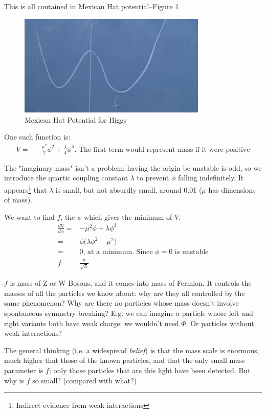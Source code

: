 \documentclass[]{article}
\begin{document}
This is all contained in Mexican Hat potential--Figure \ref{fig:2-10-MexicanHat}
\begin{figure}[H]
	\caption{Mexican Hat Potential for Higgs}\label{fig:2-10-MexicanHat}
	\includegraphics[width=0.8\textwidth]{2-10-MexicanHat}
\end{figure}
One such function is:
\begin{align*}
	V =& -\frac{\mu^2}{2} \phi^2 + \frac{\lambda}{4} \phi^4 \text{. The first term would represent mass if it were positive}
\end{align*}

The "imaginary mass" isn't a problem; having the origin be unstable is odd, so we introduce the quartic coupling constant $\lambda$ to prevent $\phi$ falling indefinitely. It appears\footnote{Indirect evidence from weak interactions} that $\lambda$ is small, but not absurdly small, around 0.01 ($\mu$ has dimensions of mass).

We want to find $f$, the $\phi$ which gives the minimum of $V$.
\begin{align*}
	\frac{d V}{d \phi} =& -\mu^2 \phi + \lambda \phi^3\\
	=& \phi \big(\lambda \phi^2 - \mu^2\big)\\
	=& 0 \text{, at a minimum. Since $\phi=0$ is unstable}\\
	f =& \frac{\mu}{\sqrt{\lambda}}
\end{align*}

$f$ is mass of Z or W Bosons, and it comes into mass of Fermion. It controls the masses of all the particles we know about: why are they all controlled by the same phenomenon? Why are there no particles whose mass doesn't involve spontaneous symmetry breaking? E.g. we can imagine a particle whose left and right variants both have weak charge: we wouldn't need $\Phi$. Or particles without weak interactions?

The general thinking (i.e. a widespread \emph{belief}) is that the mass scale is enormous, much higher that those of the known particles, and that the only small mass parameter is $f$; only those particles that are this light have been detected. But why is $f$ so small? (compared with what?) 
\end{document}
